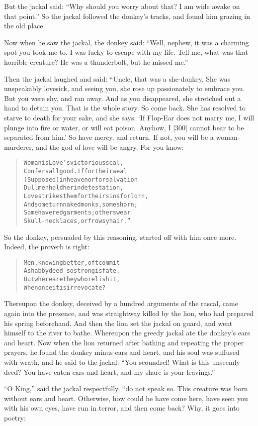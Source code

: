 \documentclass[article, twoside, 14pt]{memoir}
\renewenvironment{verbatim}{%
\begin{quote}%
\vskip -10pt%
\begin{alltt}\normalfont\large}{\end{alltt}%
\end{quote}%
\vskip -10pt
} %
\begin{document}
But the jackal said:
``Why should you worry about that? I am wide awake on that point.''
So the jackal followed the donkey's tracks, and found him grazing
in the old place.

Now when he saw the jackal, the donkey said:
``Well, nephew, it was a charming spot you took me to. I was lucky to escape with my life. Tell me, what was that horrible creature? He was a thunderbolt, but he missed me.''

Then the jackal laughed and said: “Uncle, that was a she-donkey.
She was unspeakably lovesick, and seeing you, she rose up
passionately to embrace you. But you were shy, and ran away. And as
you disappeared, she stretched out a hand to detain you. That is
the whole story. So come back. She has resolved to starve to death
for your sake, and she says:
`If Flop-Ear does not marry me, I will plunge into fire or water, or will eat poison. Anyhow, I [300] cannot bear to be separated from him.'
So have mercy, and return. If not, you will be a woman-murderer,
and the god of love will be angry. For you know:

\begin{verbatim}
Woman is Love's victorious seal,
Confers all good. If for their weal
(Supposed) in heaven or for salvation
Dull men hold her in detestation,
Love strikes them for their sins forlorn,
And some turn naked monks, some shorn;
Some have red garments; others wear
Skull-necklaces, or frowsy hair.”
\end{verbatim}
So the donkey, persuaded by this reasoning, started off with him
once more. Indeed, the proverb is right:

\begin{verbatim}
Men, knowing better, oft commit
    A shabby deed--so strong is fate.
But where are they who relish it,
    When once it is irrevocate?
\end{verbatim}
Thereupon the donkey, deceived by a hundred arguments of the
rascal, came again into the presence, and was straightway killed by
the lion, who had prepared his spring beforehand. And then the lion
set the jackal on guard, and went himself to the river to bathe.
Whereupon the greedy jackal ate the donkey's ears and heart. Now
when the lion returned after bathing and repeating the proper
prayers, he found the donkey minus ears and heart, and his soul was
suffused with wrath, and he said to the jackal:
``You scoundrel! What is this unseemly deed? You have eaten ears and heart, and my share is your leavings.''

``O King,'' said the jackal respectfully, “do not speak so. This
creature was born without ears and heart. Otherwise, how could he
have come here, have seen you with his own eyes, have run in
terror, and then come back? Why, it goes into poetry:
\end{document}
